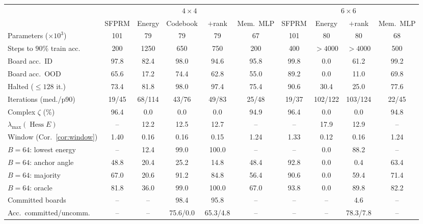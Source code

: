 \begin{tabular}{@{}lccccccccc@{}}
\toprule
 & \multicolumn{5}{c}{$4\times4$} & \multicolumn{4}{c}{$6\times6$} \\
\cmidrule(lr){2-6}\cmidrule(lr){7-10}
 & SFPRM & Energy & Codebook & $+$rank & Mem.\ MLP & SFPRM & Energy & $+$rank & Mem.\ MLP \\
\midrule
Parameters ($\times10^3$) & 101 & 79 & 79 & 79 & 67 & 101 & 80 & 80 & 68 \\
Steps to $90\%$ train acc. & 200 & 1250 & 650 & 750 & 200 & 400 & $>4000$ & $>4000$ & 500 \\
Board acc.\ ID & 97.8 & 82.4 & 98.0 & 94.6 & 95.8 & 99.8 & 0.0 & 61.2 & 99.2 \\
Board acc.\ OOD & 65.6 & 17.2 & 74.4 & 62.8 & 55.0 & 89.2 & 0.0 & 11.0 & 69.8 \\
\midrule
Halted ($\le128$ it.) & 73.4 & 81.8 & 98.0 & 97.4 & 75.4 & 90.6 & 30.4 & 25.0 & 77.6 \\
Iterations (med./p90) & 19/45 & 68/114 & 43/76 & 49/83 & 25/48 & 19/37 & 102/122 & 103/124 & 22/45 \\
Complex $\zeta$ (\%) & 96.4 & 0.0 & 0.0 & 0.0 & 94.9 & 96.4 & 0.0 & 0.0 & 94.8 \\
$\lambda_{\max}(\operatorname{Hess}E)$ & -- & 12.2 & 12.5 & 12.7 & -- & -- & 17.9 & 12.9 & -- \\
Window (Cor.~\ref{cor:window}) & 1.40 & 0.16 & 0.16 & 0.15 & 1.24 & 1.33 & 0.12 & 0.16 & 1.24 \\
\midrule
$B{=}64$: lowest energy & -- & 12.4 & 99.0 & 100.0 & -- & -- & 0.0 & 88.2 & -- \\
$B{=}64$: anchor angle & 48.8 & 20.4 & 25.2 & 14.8 & 48.4 & 92.8 & 0.0 & 0.4 & 63.4 \\
$B{=}64$: majority & 67.0 & 20.6 & 91.2 & 84.8 & 56.4 & 90.6 & 0.0 & 59.4 & 71.4 \\
$B{=}64$: oracle & 81.8 & 36.0 & 99.0 & 100.0 & 67.0 & 93.8 & 0.0 & 89.8 & 82.2 \\
\midrule
Committed boards & -- & -- & 98.4 & 95.8 & -- & -- & -- & 4.6 & -- \\
Acc.\ committed/uncomm. & -- & -- & 75.6/0.0 & 65.3/4.8 & -- & -- & -- & 78.3/7.8 & -- \\
\bottomrule
\end{tabular}
